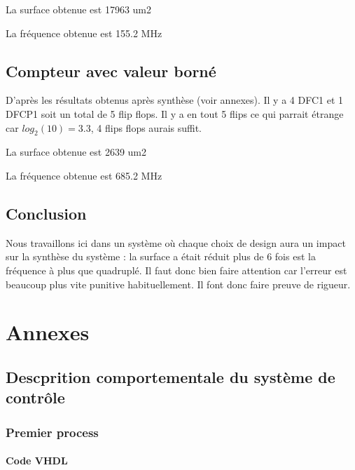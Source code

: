 \documentclass{article}
\newcommand{\subsubsubsection}[1]{\paragraph{#1}\mbox{}\\}
\begin{document}
La surface obtenue est 17963 um2 

La fréquence obtenue est 155.2 MHz


\subsection{Compteur avec valeur borné}

D'après les résultats obtenus après synthèse (voir annexes). Il y a 4 DFC1 et 1 DFCP1 soit un total de 5 flip flops. Il y a en tout 5 flips ce qui parrait étrange car $log_2(10) = 3.3 $, 4 flips flops aurais suffit. 

La surface obtenue est  2639 um2 

La fréquence obtenue est  685.2 MHz

\subsection{Conclusion}

Nous travaillons ici dans un système où chaque choix de design aura un impact sur la synthèse du système : la surface a était réduit plus de 6 fois est la fréquence à plus que quadruplé. Il faut donc bien faire attention car l'erreur est beaucoup plus vite punitive habituellement. Il font donc faire preuve de rigueur.

\newpage
\section{Annexes}
\subsection{Descprition comportementale du système de contrôle}
\subsubsection{Premier process}
\subsubsubsection{Code VHDL}
\end{document}
